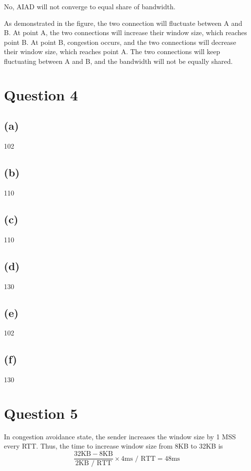 \documentclass[a4paper,12pt]{article}
\begin{document}
No, AIAD will not converge to equal share of bandwidth. 

As demonstrated in the figure, the two connection will fluctuate between A and B. At point A, the two connections will increase their window size, which reaches point B. At point B, congestion occurs, and the two connections will decrease their window size, which reaches point A. The two connections will keep fluctuating between A and B, and the bandwidth will not be equally shared.

\section*{Question 4}

\subsection*{(a)}

102

\subsection*{(b)}

110

\subsection*{(c)}

110

\subsection*{(d)}

130

\subsection*{(e)}

102

\subsection*{(f)}

130

\section*{Question 5}

In congestion avoidance state, the sender increases the window size by 1 MSS every RTT. Thus, the time to increase window size from 8KB to 32KB is
\begin{equation*}
  \frac{32 \text{KB} - 8 \text{KB}}{2 \text{KB / RTT}} \times 4 \text{ms / RTT} = 48 \text{ms}
\end{equation*}
\end{document}
